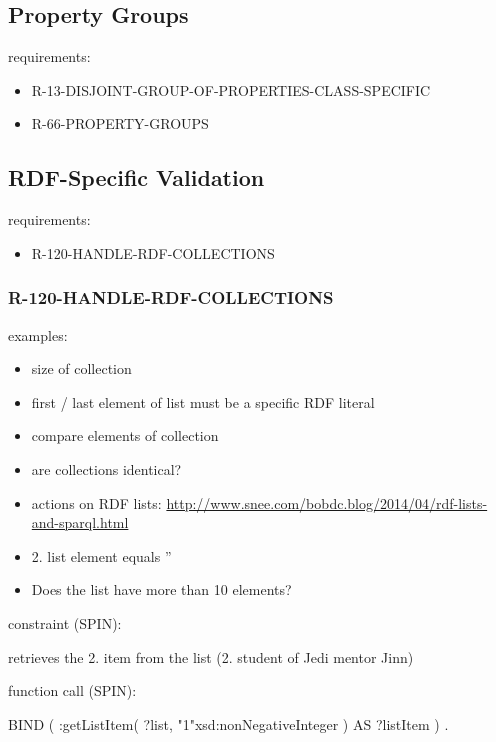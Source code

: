 \documentclass{llncs}
\begin{document}
\subsection{Property Groups}

requirements:

\begin{itemize}
	\item R-13-DISJOINT-GROUP-OF-PROPERTIES-CLASS-SPECIFIC
	\item R-66-PROPERTY-GROUPS
\end{itemize}

\subsection{RDF-Specific Validation}

requirements:

\begin{itemize}
	\item R-120-HANDLE-RDF-COLLECTIONS
\end{itemize}

\subsubsection{R-120-HANDLE-RDF-COLLECTIONS}

examples:

\begin{itemize}
	\item size of collection
	\item first / last element of list must be a specific RDF literal
	\item compare elements of collection
	\item are collections identical?
	\item actions on RDF lists: \url{http://www.snee.com/bobdc.blog/2014/04/rdf-lists-and-sparql.html}
	\item 2. list element equals ''
	\item Does the list have more than 10 elements?
\end{itemize}

constraint (SPIN):

retrieves the 2. item from the list (2. student of Jedi mentor Jinn)

function call (SPIN):

\begin{ex}
BIND ( :getListItem( ?list, "1"xsd:nonNegativeInteger ) AS ?listItem ) .
\end{ex}
\end{document}
